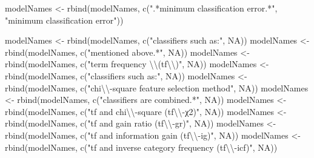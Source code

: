 \documentclass[
]{article}
\newenvironment{Shaded}{\begin{snugshade}}{\end{snugshade}}
\newcommand{\ConstantTok}[1]{\textcolor[rgb]{0.00,0.00,0.00}{#1}}
\newcommand{\FunctionTok}[1]{\textcolor[rgb]{0.00,0.00,0.00}{#1}}
\newcommand{\NormalTok}[1]{#1}
\newcommand{\OtherTok}[1]{\textcolor[rgb]{0.56,0.35,0.01}{#1}}
\newcommand{\SpecialCharTok}[1]{\textcolor[rgb]{0.00,0.00,0.00}{#1}}
\newcommand{\StringTok}[1]{\textcolor[rgb]{0.31,0.60,0.02}{#1}}
\begin{document}
\begin{Shaded}
\begin{Highlighting}[]
\NormalTok{modelNames }\OtherTok{\textless{}{-}} \FunctionTok{rbind}\NormalTok{(modelNames, }\FunctionTok{c}\NormalTok{(}\StringTok{".*minimum classification error.*"}\NormalTok{, }\StringTok{"minimum classification error"}\NormalTok{))}

\NormalTok{modelNames }\OtherTok{\textless{}{-}} \FunctionTok{rbind}\NormalTok{(modelNames, }\FunctionTok{c}\NormalTok{(}\StringTok{"classifiers such as:"}\NormalTok{, }\ConstantTok{NA}\NormalTok{))}
\NormalTok{modelNames }\OtherTok{\textless{}{-}} \FunctionTok{rbind}\NormalTok{(modelNames, }\FunctionTok{c}\NormalTok{(}\StringTok{"mentioned above.*"}\NormalTok{, }\ConstantTok{NA}\NormalTok{))}
\NormalTok{modelNames }\OtherTok{\textless{}{-}} \FunctionTok{rbind}\NormalTok{(modelNames, }\FunctionTok{c}\NormalTok{(}\StringTok{"term frequency }\SpecialCharTok{\textbackslash{}\textbackslash{}}\StringTok{(tf}\SpecialCharTok{\textbackslash{}\textbackslash{}}\StringTok{)"}\NormalTok{, }\ConstantTok{NA}\NormalTok{))}
\NormalTok{modelNames }\OtherTok{\textless{}{-}} \FunctionTok{rbind}\NormalTok{(modelNames, }\FunctionTok{c}\NormalTok{(}\StringTok{"classifiers such as:"}\NormalTok{, }\ConstantTok{NA}\NormalTok{))}
\NormalTok{modelNames }\OtherTok{\textless{}{-}} \FunctionTok{rbind}\NormalTok{(modelNames, }\FunctionTok{c}\NormalTok{(}\StringTok{"chi}\SpecialCharTok{\textbackslash{}\textbackslash{}}\StringTok{{-}square feature selection method"}\NormalTok{, }\ConstantTok{NA}\NormalTok{))}
\NormalTok{modelNames }\OtherTok{\textless{}{-}} \FunctionTok{rbind}\NormalTok{(modelNames, }\FunctionTok{c}\NormalTok{(}\StringTok{"classifiers are combined.*"}\NormalTok{, }\ConstantTok{NA}\NormalTok{))}
\NormalTok{modelNames }\OtherTok{\textless{}{-}} \FunctionTok{rbind}\NormalTok{(modelNames, }\FunctionTok{c}\NormalTok{(}\StringTok{"tf and chi}\SpecialCharTok{\textbackslash{}\textbackslash{}}\StringTok{{-}square (tf}\SpecialCharTok{\textbackslash{}\textbackslash{}}\StringTok{{-}χ2)"}\NormalTok{, }\ConstantTok{NA}\NormalTok{))}
\NormalTok{modelNames }\OtherTok{\textless{}{-}} \FunctionTok{rbind}\NormalTok{(modelNames, }\FunctionTok{c}\NormalTok{(}\StringTok{"tf and gain ratio (tf}\SpecialCharTok{\textbackslash{}\textbackslash{}}\StringTok{{-}gr)"}\NormalTok{, }\ConstantTok{NA}\NormalTok{))}
\NormalTok{modelNames }\OtherTok{\textless{}{-}} \FunctionTok{rbind}\NormalTok{(modelNames, }\FunctionTok{c}\NormalTok{(}\StringTok{"tf and information gain (tf}\SpecialCharTok{\textbackslash{}\textbackslash{}}\StringTok{{-}ig)"}\NormalTok{, }\ConstantTok{NA}\NormalTok{))}
\NormalTok{modelNames }\OtherTok{\textless{}{-}} \FunctionTok{rbind}\NormalTok{(modelNames, }\FunctionTok{c}\NormalTok{(}\StringTok{"tf and inverse category frequency (tf}\SpecialCharTok{\textbackslash{}\textbackslash{}}\StringTok{{-}icf)"}\NormalTok{, }\ConstantTok{NA}\NormalTok{))}

\end{Highlighting}
\end{Shaded}
\end{document}
